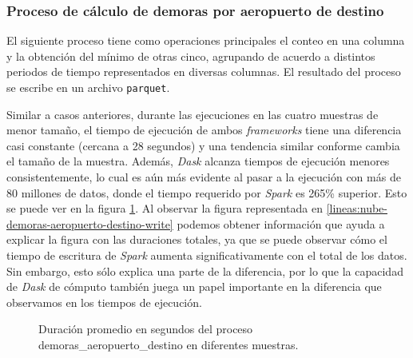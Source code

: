 \subsubsection{Proceso de cálculo de demoras por aeropuerto de destino}

El siguiente proceso tiene como operaciones principales el conteo en una columna y la obtención del mínimo de otras cinco, agrupando de acuerdo a distintos periodos de tiempo representados en diversas columnas. El resultado del proceso se escribe en un archivo \texttt{parquet}.

Similar a casos anteriores, durante las ejecuciones en las cuatro muestras de menor tamaño, el tiempo de ejecución de ambos \textit{frameworks} tiene una diferencia casi constante (cercana a 28 segundos) y una tendencia similar conforme cambia el tamaño de la muestra. Además, \textit{Dask} alcanza tiempos de ejecución menores consistentemente, lo cual es aún más evidente al pasar a la ejecución con más de 80 millones de datos, donde el tiempo requerido por \textit{Spark} es 265\% superior. Esto se puede ver en la figura \ref{lineas:nube-demoras-aeropuerto-destino}. Al observar la figura representada en \ref{lineas:nube-demoras-aeropuerto-destino-write} podemos obtener información que ayuda a explicar la figura con las duraciones totales, ya que se puede observar cómo el tiempo de escritura de \textit{Spark} aumenta significativamente con el total de los datos. Sin embargo, esto sólo explica una parte de la diferencia, por lo que la capacidad de \textit{Dask} de cómputo también juega un papel importante en la diferencia que observamos en los tiempos de ejecución.

\begin{figure}
\centering
{}
\caption{Duración promedio en segundos del proceso demoras\_aeropuerto\_destino en diferentes muestras.}
\label{lineas:nube-demoras-aeropuerto-destino}
\end{figure}

